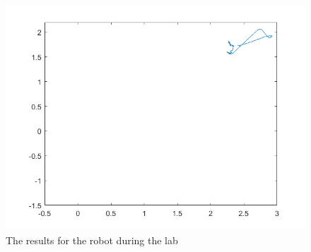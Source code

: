 \documentclass[a4paper,12pt,oneside,onecolumn]{article} %
\begin{document}
\begin{figure}[H]
    \centering
    \includegraphics[scale=0.6]{../matlab/images/task22.png}
    \caption{The results for the robot during the lab}
    \label{fig:task22}
\end{figure}
\end{document}
